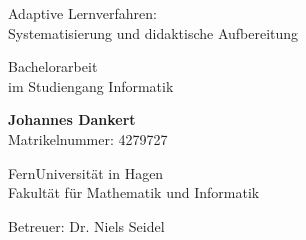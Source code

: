 \begin{titlepage}
\centering

\vspace*{2cm}

{\Huge Adaptive Lernverfahren:\\
Systematisierung und didaktische Aufbereitung \par}

\vspace{2cm}

Bachelorarbeit\\
im Studiengang Informatik

\vspace{2cm}

\textbf{Johannes Dankert}\\
Matrikelnummer: 4279727

\vfill

FernUniversität in Hagen\\
Fakultät für Mathematik und Informatik\\

\vspace{1cm}

Betreuer: Dr. Niels Seidel

\vspace{2cm}

\the\year

\end{titlepage}
\newpage